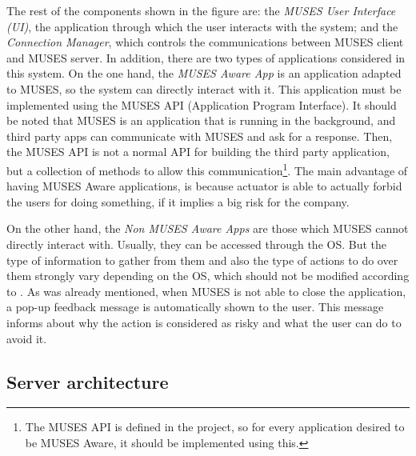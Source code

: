 The rest of the components shown in the figure are: the \textit{MUSES User Interface (UI)}, the application through which the user interacts with the system; and the \textit{Connection Manager}, which controls the communications between MUSES client and MUSES server. 
In addition, there are two types of applications considered in this system. On the one hand, the \textit{MUSES Aware App} is an application adapted to MUSES, so the system can directly interact with it. This application must be implemented using the MUSES API (Application Program Interface). It should be noted that MUSES is an application that is running in the background, and third party apps can communicate with MUSES and ask for a response. Then, the MUSES API is not a normal API for building the third party application, but a collection of methods to allow this communication\footnote{The MUSES API is defined in the project, so for every application desired to be MUSES Aware, it should be implemented using this.}.
The main advantage of having MUSES Aware applications, is because actuator is able to actually forbid the users for doing something, if it implies a big risk for the company.

On the other hand, the \textit{Non MUSES Aware Apps} are those which MUSES cannot directly interact with. Usually, they can be accessed through the OS. But the type of information to gather from them and also the type of actions to do over them strongly vary depending on the OS, which should not be modified according to  \cite{Gessner13userfriendly}.
As was already mentioned, when MUSES is not able to close the application, a pop-up feedback message is automatically shown to the user. This message informs about why the action is considered as risky and what the user can do to avoid it.


\subsection{Server architecture}

